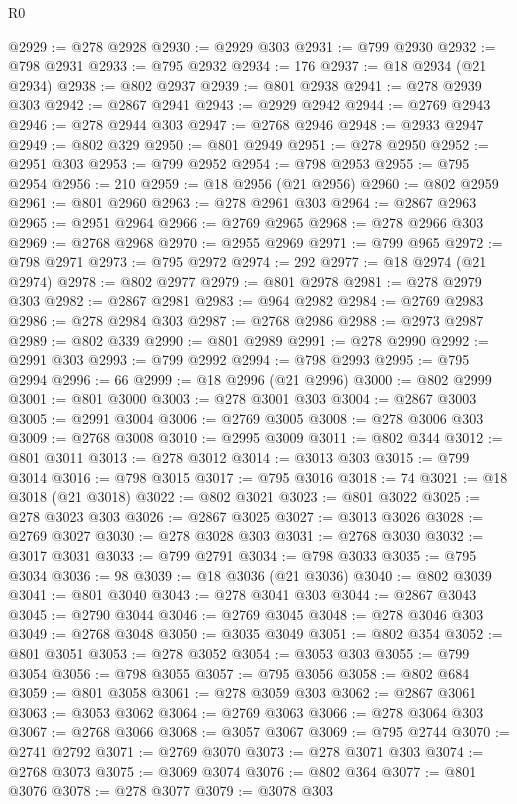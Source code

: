 \begin{lexlean}{R0}
\begin{coremodule}
@2929 := @278 @2928
@2930 := @2929 @303
@2931 := @799 @2930
@2932 := @798 @2931
@2933 := @795 @2932
@2934 := 176
@2937 := @18 @2934 (@21 @2934)
@2938 := @802 @2937
@2939 := @801 @2938
@2941 := @278 @2939 @303
@2942 := @2867 @2941
@2943 := @2929 @2942
@2944 := @2769 @2943
@2946 := @278 @2944 @303
@2947 := @2768 @2946
@2948 := @2933 @2947
@2949 := @802 @329
@2950 := @801 @2949
@2951 := @278 @2950
@2952 := @2951 @303
@2953 := @799 @2952
@2954 := @798 @2953
@2955 := @795 @2954
@2956 := 210
@2959 := @18 @2956 (@21 @2956)
@2960 := @802 @2959
@2961 := @801 @2960
@2963 := @278 @2961 @303
@2964 := @2867 @2963
@2965 := @2951 @2964
@2966 := @2769 @2965
@2968 := @278 @2966 @303
@2969 := @2768 @2968
@2970 := @2955 @2969
@2971 := @799 @965
@2972 := @798 @2971
@2973 := @795 @2972
@2974 := 292
@2977 := @18 @2974 (@21 @2974)
@2978 := @802 @2977
@2979 := @801 @2978
@2981 := @278 @2979 @303
@2982 := @2867 @2981
@2983 := @964 @2982
@2984 := @2769 @2983
@2986 := @278 @2984 @303
@2987 := @2768 @2986
@2988 := @2973 @2987
@2989 := @802 @339
@2990 := @801 @2989
@2991 := @278 @2990
@2992 := @2991 @303
@2993 := @799 @2992
@2994 := @798 @2993
@2995 := @795 @2994
@2996 := 66
@2999 := @18 @2996 (@21 @2996)
@3000 := @802 @2999
@3001 := @801 @3000
@3003 := @278 @3001 @303
@3004 := @2867 @3003
@3005 := @2991 @3004
@3006 := @2769 @3005
@3008 := @278 @3006 @303
@3009 := @2768 @3008
@3010 := @2995 @3009
@3011 := @802 @344
@3012 := @801 @3011
@3013 := @278 @3012
@3014 := @3013 @303
@3015 := @799 @3014
@3016 := @798 @3015
@3017 := @795 @3016
@3018 := 74
@3021 := @18 @3018 (@21 @3018)
@3022 := @802 @3021
@3023 := @801 @3022
@3025 := @278 @3023 @303
@3026 := @2867 @3025
@3027 := @3013 @3026
@3028 := @2769 @3027
@3030 := @278 @3028 @303
@3031 := @2768 @3030
@3032 := @3017 @3031
@3033 := @799 @2791
@3034 := @798 @3033
@3035 := @795 @3034
@3036 := 98
@3039 := @18 @3036 (@21 @3036)
@3040 := @802 @3039
@3041 := @801 @3040
@3043 := @278 @3041 @303
@3044 := @2867 @3043
@3045 := @2790 @3044
@3046 := @2769 @3045
@3048 := @278 @3046 @303
@3049 := @2768 @3048
@3050 := @3035 @3049
@3051 := @802 @354
@3052 := @801 @3051
@3053 := @278 @3052
@3054 := @3053 @303
@3055 := @799 @3054
@3056 := @798 @3055
@3057 := @795 @3056
@3058 := @802 @684
@3059 := @801 @3058
@3061 := @278 @3059 @303
@3062 := @2867 @3061
@3063 := @3053 @3062
@3064 := @2769 @3063
@3066 := @278 @3064 @303
@3067 := @2768 @3066
@3068 := @3057 @3067
@3069 := @795 @2744
@3070 := @2741 @2792
@3071 := @2769 @3070
@3073 := @278 @3071 @303
@3074 := @2768 @3073
@3075 := @3069 @3074
@3076 := @802 @364
@3077 := @801 @3076
@3078 := @278 @3077
@3079 := @3078 @303

\end{coremodule}
\end{lexlean}
